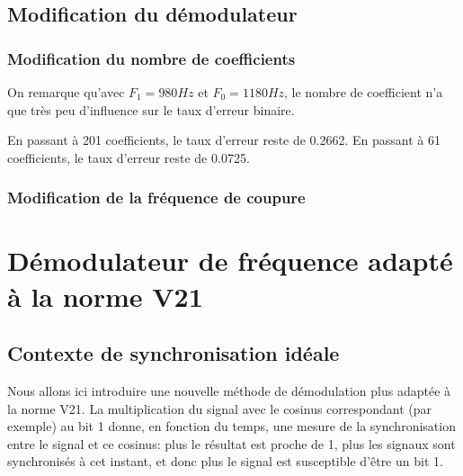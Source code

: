 \documentclass{article}
\begin{document}
\subsection{Modification du démodulateur} 

\subsubsection{Modification du nombre de coefficients}

On remarque qu'avec $F_1=980Hz$ et $F_0=1180Hz$, le nombre de coefficient n'a que très peu d'influence sur le taux d'erreur binaire.

En passant à 201 coefficients, le taux d'erreur reste de 0.2662.
En passant à 61 coefficients, le taux d'erreur reste de 0.0725. 









\subsubsection{Modification de la fréquence de coupure}



\section{Démodulateur de fréquence adapté à la norme V21}

\subsection{Contexte de synchronisation idéale}

Nous allons ici introduire une nouvelle méthode de démodulation plus adaptée à la norme V21.
La multiplication du signal avec le cosinus correspondant (par exemple) au bit 1 donne, en fonction du temps, une mesure de la synchronisation entre le signal et ce cosinus: plus le résultat est proche de 1, plus les signaux sont synchronisés à cet instant, et donc plus le signal est susceptible d'être un bit 1.
\end{document}
